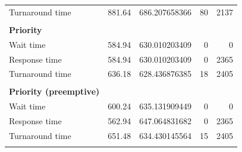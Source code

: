 \documentclass[12pt,letterpaper]{article}
\begin{document}
\begin{appendices}
\begin{table}[H]
\begin{tabular}{l r r r r}
					Turnaround time &	881.64 &	686.207658366 &	80 &	2137 	\\
					\\
					\textbf{Priority} \\
					\hline
					Wait time &		584.94 &	630.010203409 &	0 &	0 	\\
					Response time &		584.94 &	630.010203409 &	0 &	2365 	\\
					Turnaround time &	636.18 &	628.436876385 &	18 &	2405 	\\
					\\
					\textbf{Priority (preemptive)} \\
					\hline
					Wait time &		600.24 &	635.131909449 &	0 &	0 	\\
					Response time &		562.94 &	647.064831682 &	0 &	2365 	\\
					Turnaround time &	651.48 &	634.430145564 &	15 &	2405 	\\
					\\
				\end{tabular}
			\end{table}


\end{appendices}
\end{document}
